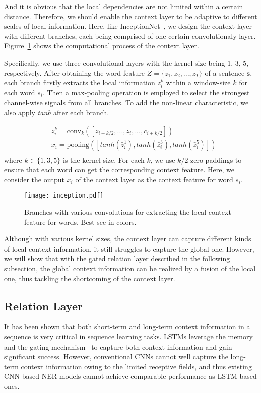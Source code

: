 \documentclass[letterpaper]{article} \usepackage{aaai19}  \usepackage{times}  \usepackage{helvet}  \usepackage{courier}  \usepackage{url}  \usepackage{graphicx}  \usepackage{amsmath}
\begin{document}
And it is obvious that the local dependencies are not limited within a certain distance. Therefore, we should enable the context layer to be adaptive to different scales of local information. Here, like InceptionNet~\cite{szegedy2015going}, we design the context layer with different branches, each being comprised of one certain convolutionaly layer. Figure~\ref{fig:inception} shows the computational process of the context layer.

Specifically, we use three convolutional layers with the kernel size being 1, 3, 5, respectively. After obtaining the word feature $Z=\{z_1,z_2,...,z_T\}$ of a sentence $\bm{s}$, each branch firstly extracts the local information $\bar{z}_i^k$ within a window-size $k$ for each word $s_i$. Then a max-pooling operation is employed to select the strongest channel-wise signals from all branches. To add the non-linear characteristic, we also apply \textit{tanh} after each branch.

\begin{equation}
\label{eq:inception}
\begin{aligned}
&\bar{z}_i^k = \text{conv}_k([z_{i-k/2},...,z_i,...,c_{i+k/2}])\\
& x_i = \text{pooling}([tanh(\bar{z}_i^1),tanh(\bar{z}_i^3),tanh(\bar{z}^5_i)])\\
\end{aligned}
\end{equation}
where $k \in \{1,3,5\}$ is the kernel size. For each $k$, we use $k/2$ zero-paddings to ensure that each word can get the corresponding context feature. Here, we consider the output $x_i$ of the context layer as the context feature for word $s_i$.

\begin{figure}[!t] \centering
  \texttt{[image: inception.pdf]}
  \caption{Branches with various convolutions for extracting the local context feature for words. Best see in colors.}
  \label{fig:inception}
\end{figure}

Although with various kernel sizes, the context layer can capture different kinds of local context information, it still struggles to capture the global one. However, we will show that with the gated relation layer described in the following subsection, the global context information can be realized by a fusion of the local one, thus tackling the shortcoming of the context layer.

\subsection{Relation Layer}
It has been shown that both short-term and long-term context information in a sequence is very critical in sequence learning tasks. LSTMs leverage the memory and the gating mechanism~\cite{hochreiter1997long} to capture both context information and gain significant success. However, conventional CNNs cannot well capture the long-term context information owing to the limited receptive fields, and thus existing CNN-based NER models cannot achieve comparable performance as LSTM-based ones.
\end{document}
